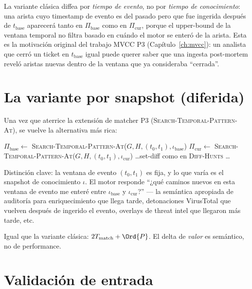 La variante clásica diffea por \emph{tiempo de evento}, no por
\emph{tiempo de conocimiento}: una arista cuyo timestamp de
evento es del pasado pero que fue ingerida después de
$t_{\text{base}}$ aparecerá tanto en $\Pi_{\text{base}}$ como en
$\Pi_{\text{cur}}$, porque el upper-bound de la ventana temporal
no filtra basado en cuándo el motor se enteró de la arista. Esta
es la motivación original del trabajo MVCC P3
(Capítulo~\ref{ch:mvcc}): un analista que cerró un ticket en
$t_{\text{base}}$ igual puede querer saber que una ingesta
post-mortem reveló aristas nuevas dentro de la ventana que ya
consideraba ``cerrada''.

\section{La variante por snapshot (diferida)}

Una vez que aterrice la extensión de matcher P3
(\textsc{Search-Temporal-Pattern-At}), 
se vuelve la alternativa más rica:

\begin{algorithm}
\caption{\textsc{Diff-By-Snapshot} (diferida)}\label{alg:diff-snapshot}
$\Pi_{\text{base}} \gets $ \textsc{Search-Temporal-Pattern-At}($G, H, (t_0, t_1), \iota_{\text{base}}$)\;
$\Pi_{\text{cur}} \gets $ \textsc{Search-Temporal-Pattern-At}($G, H, (t_0, t_1), \iota_{\text{cur}}$)\;
\ldots set-diff como en \textsc{Diff-Hunts} \ldots
\end{algorithm}

Distinción clave: la ventana de evento $(t_0, t_1)$ es fija, y lo
que varía es el snapshot de conocimiento $\iota$. El motor
responde ``¿qué caminos nuevos en esta ventana de evento me
enteré entre $\iota_{\text{base}}$ y $\iota_{\text{cur}}$?'' ---
la semántica apropiada de auditoría para enriquecimiento que
llega tarde, detonaciones VirusTotal que vuelven después de
ingerido el evento, overlays de threat intel que llegaron más
tarde, etc.

\begin{complexity}
Igual que la variante clásica: $2 T_{\text{match}} + \Ord{P}$.
El delta de \emph{valor} es semántico, no de performance.
\end{complexity}

\section{Validación de entrada}

